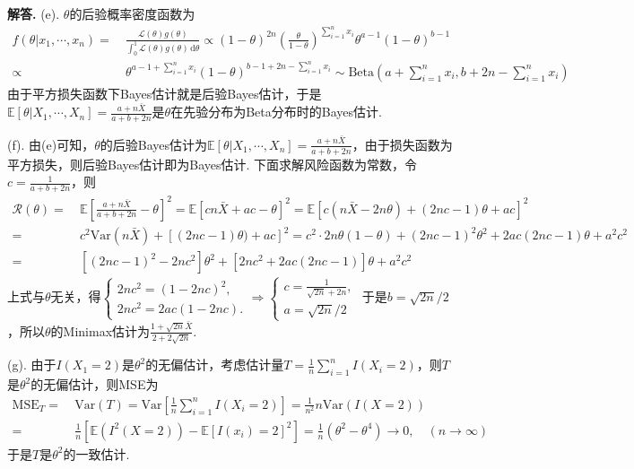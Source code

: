 \documentclass[12pt, a4paper, oneside]{ctexart}
\newenvironment{solution}[1][]{\par\noindent\textbf{#1解答. }}{\smallskip\par}  %
\def\E{\mathbb{E}}          %
\def\var{\text{Var}}        %
\def\d{\mathrm{d}}          %
\def\L{\mathcal{L}}         %
\begin{document}
\begin{solution}
    (e). $\theta$的后验概率密度函数为
    \begin{align*}
        f(\theta|x_1,\cdots,x_n)=&\ \frac{\L(\theta)g(\theta)}{\int_0^1\L(\theta)g(\theta)\,\d \theta}\propto (1-\theta)^{2n}\left(\frac{\theta}{1-\theta}\right)^{\sum\limits_{i=1}^nx_i}\theta^{a-1}(1-\theta)^{b-1}\\
        \propto&\ \theta^{a-1+\sum\limits_{i=1}^nx_i}(1-\theta)^{b-1+2n-\sum\limits_{i=1}^nx_i}\sim \text{Beta}\left(a+\sum_{i=1}^nx_i,b+2n-\sum_{i=1}^nx_i\right)
    \end{align*}
    由于平方损失函数下Bayes估计就是后验Bayes估计，于是$\E[\theta|X_1,\cdots,X_n]=\frac{a+n\bar{X}}{a+b+2n}$是$\theta$在先验分布为Beta分布时的Bayes估计.

    (f). 由(e)可知，$\theta$的后验Bayes估计为$\E[\theta|X_1,\cdots,X_n]=\frac{a+n\bar{X}}{a+b+2n}$，由于损失函数为平方损失，则后验Bayes估计即为Bayes估计. 下面求解风险函数为常数，令$c = \frac{1}{a+b+2n}$，则
    \begin{align*}
        \mathcal{R}(\theta) =&\ \E\left[\frac{a+n\bar{X}}{a+b+2n}-\theta\right]^2 = \E\left[cn\bar{X}+ac-\theta\right]^2 = \E\left[c(n\bar{X}-2n\theta)+(2nc-1)\theta+ac\right]^2\\
        =&\ c^2\var(n\bar{X}) + [(2nc-1)\theta)+ac]^2 = c^2\cdot 2n\theta(1-\theta)+(2nc-1)^2\theta^2+2ac(2nc-1)\theta+a^2c^2\\
        =&\ [(2nc-1)^2-2nc^2]\theta^2+[2nc^2+2ac(2nc-1)]\theta+a^2c^2
    \end{align*}
    上式与$\theta$无关，得$\begin{cases}
        2nc^2=(1-2nc)^2,\\
        2nc^2=2ac(1-2nc).
    \end{cases}\Rightarrow \begin{cases}
        c = \frac{1}{\sqrt{2n}+2n},\\
        a = \sqrt{2n}/2
    \end{cases}$
    于是$b = \sqrt{2n}/2$，所以$\theta$的Minimax估计为$\frac{1+\sqrt{2n}\bar{X}}{2+2\sqrt{2n}}$.

    (g). 由于$I(X_1=2)$是$\theta^2$的无偏估计，考虑估计量$T = \frac{1}{n}\sum_{i=1}^nI(X_i = 2)$，则$T$是$\theta^2$的无偏估计，则MSE为
    \begin{align*}
        \text{MSE}_T =&\ \var(T) = \var\left[\frac{1}{n}\sum_{i=1}^nI(X_i=2)\right] = \frac{1}{n^2}n\var(I(X=2))\\
        =&\ \frac{1}{n}\left[\E(I^2(X=2))-\E[I(x_i)=2]^2\right] = \frac{1}{n}(\theta^2-\theta^4)\to 0,\quad(n\to\infty)
    \end{align*}
    于是$T$是$\theta^2$的一致估计.
\end{solution}
\end{document}
